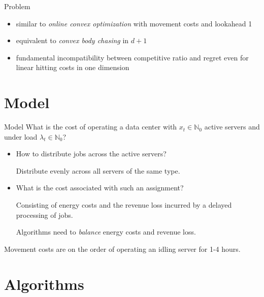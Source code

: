 \documentclass{beamer}
\def\spadding{\vspace{0.25cm}}
\begin{document}
\begin{frame}{Problem}
\begin{itemize}
    \item similar to \emph{online convex optimization} with movement costs and lookahead 1\pause
    \item equivalent to \emph{convex body chasing} in $d + 1$\pause
    \item fundamental incompatibility between competitive ratio and regret even for linear hitting costs in one dimension
\end{itemize}
\end{frame}

\section{Model}

\begin{frame}{Model}
What is the cost of operating a data center with $x_t \in \mathbb{N}_0$ active servers and under load $\lambda_t \in \mathbb{N}_0$?\pause
\begin{itemize}
    \item How to distribute jobs across the active servers?\pause\par
        Distribute evenly across all servers of the same type.\pause
    \item What is the cost associated with such an assignment?\pause\par
        Consisting of energy costs and the revenue loss incurred by a delayed processing of jobs.\pause\par
        Algorithms need to \emph{balance} energy costs and revenue loss.
\end{itemize}\pause\spadding

Movement costs are on the order of operating an idling server for 1-4 hours.
\end{frame}

\section{Algorithms}
\end{document}
